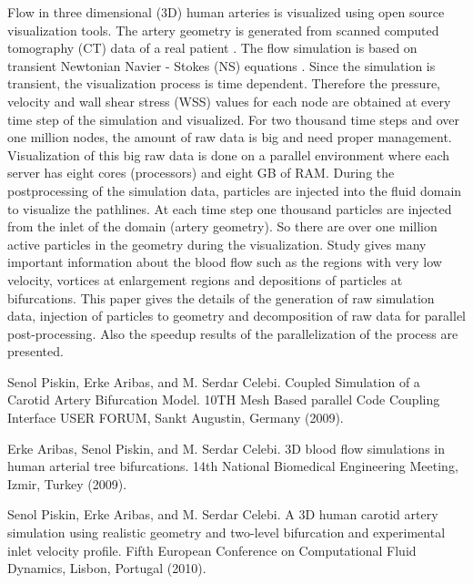 Flow in three dimensional (3D) human arteries is visualized using open source 
visualization tools. The artery geometry is generated from scanned computed 
tomography (CT) data of a real patient \cite{fsi2009,biomed}. The flow 
simulation is based on transient Newtonian Navier - Stokes (NS) equations 
\cite{cfd2010}. Since the simulation is transient, the visualization process is 
time dependent. Therefore the pressure, velocity and wall shear stress (WSS) 
values for each node are obtained at every time step of the simulation and 
visualized. For two thousand time steps and over one million nodes, the amount 
of raw data is big and need proper management. Visualization of this big raw 
data is done on a parallel environment where each server has eight cores 
(processors) and eight GB of RAM. During the postprocessing of the simulation 
data, particles are injected into the fluid domain to visualize the pathlines. 
At each time step one thousand particles are injected from the inlet of the 
domain (artery geometry). So there are over one million active particles in the 
geometry during the visualization. Study gives many important information about 
the blood flow such as the regions with very low velocity, vortices at 
enlargement regions and depositions of particles at bifurcations. This paper 
gives the details of the generation of raw simulation data, injection of 
particles to geometry and decomposition of raw data for parallel 
post-processing. Also the speedup results of the parallelization of the process 
are presented.


\begin{thebibliography}{10}
{\sc Senol Piskin, Erke Aribas, and M. Serdar Celebi}. {Coupled Simulation of a 
Carotid Artery Bifurcation Model}. 10TH Mesh Based parallel Code Coupling 
Interface USER FORUM, Sankt Augustin, Germany (2009).

{\sc Erke Aribas, Senol Piskin, and M. Serdar Celebi}. {3D blood flow 
simulations in human arterial tree bifurcations}. 14th National Biomedical 
Engineering Meeting, Izmir, Turkey (2009).

{\sc Senol Piskin, Erke Aribas, and M. Serdar Celebi}. {A 3D human carotid 
artery simulation using realistic geometry and two-level bifurcation and 
experimental inlet velocity profile}. Fifth European Conference on 
Computational Fluid Dynamics, Lisbon, Portugal (2010).

\end{thebibliography}

